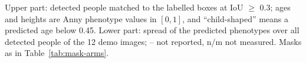 \begin{table}[!tbp]
\smallskip
\parbox{\linewidth}{\scriptsize Upper part: detected people matched to the labelled boxes at IoU $\geq$ 0.3; ages and
heights are Anny phenotype values in $[0, 1]$, and ``child-shaped'' means a predicted age below 0.45. Lower part:
spread of the predicted phenotypes over all detected people of the 12 demo images; -- not reported, n/m not measured.
Masks as in Table~\ref{tab:mask-arms}.}
\caption[Body shape on real photographs: Relative Human and the demo images]{Body shape of the teacher variants on real
photographs: Relative Human validation split (635 images, 2,130 labelled people) and the demo images. No value is a
student result.}
\label{tab:relhuman}
\end{table}
